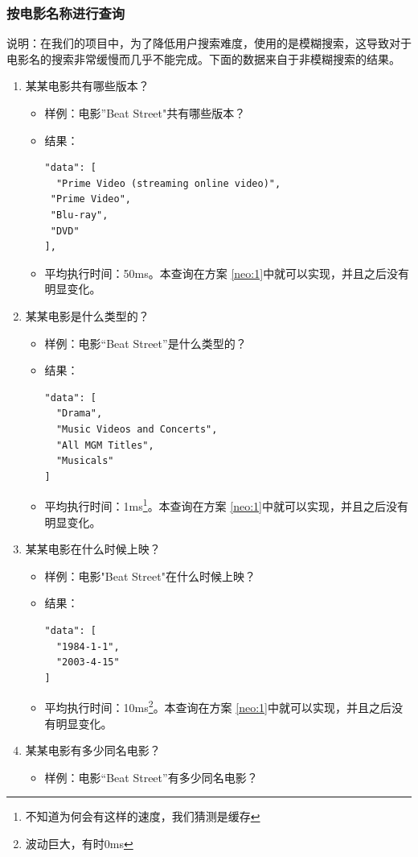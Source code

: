 \documentclass{ctexrep}
\begin{document}
	\subsubsection{按电影名称进行查询}
	 说明：在我们的项目中，为了降低用户搜索难度，使用的是模糊搜索，这导致对于电影名的搜索非常缓慢而几乎不能完成。下面的数据来自于非模糊搜索的结果。
		\begin{enumerate}
		\item 某某电影共有哪些版本？\begin{itemize}
			\item 样例：电影”Beat Street"共有哪些版本？
			\item 结果：\begin{lstlisting}
"data": [
  "Prime Video (streaming online video)",    
 "Prime Video",
 "Blu-ray",
 "DVD"
],
			\end{lstlisting}
			\item 平均执行时间：50ms。本查询在方案 \ref{neo:1}中就可以实现，并且之后没有明显变化。
		\end{itemize}
		\item 某某电影是什么类型的？\begin{itemize}
			\item 样例：电影“Beat Street”是什么类型的？
			\item 结果：\begin{lstlisting}
"data": [
  "Drama",
  "Music Videos and Concerts",
  "All MGM Titles",
  "Musicals"
]
			\end{lstlisting}
			\item 平均执行时间：1ms\footnote{不知道为何会有这样的速度，我们猜测是缓存}。本查询在方案 \ref{neo:1}中就可以实现，并且之后没有明显变化。
		\end{itemize}
		\item 某某电影在什么时候上映？\begin{itemize}
			\item 样例：电影"Beat Street"在什么时候上映？
			\item 结果：\begin{lstlisting}
"data": [
  "1984-1-1",
  "2003-4-15"
]
			\end{lstlisting}
			\item 平均执行时间：10ms\footnote{波动巨大，有时0ms}。本查询在方案 \ref{neo:1}中就可以实现，并且之后没有明显变化。
		\end{itemize}
		\item 某某电影有多少同名电影？\begin{itemize}
			\item 样例：电影“Beat Street”有多少同名电影？

\end{itemize}
\end{enumerate}
\end{document}
